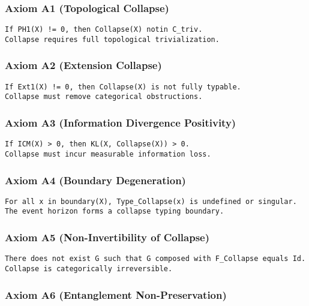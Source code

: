 \documentclass[11pt]{article}
\begin{document}
\subsubsection*{Axiom A1 (Topological Collapse)}

\begin{lstlisting}
If PH1(X) != 0, then Collapse(X) notin C_triv.
Collapse requires full topological trivialization.
\end{lstlisting}

\subsubsection*{Axiom A2 (Extension Collapse)}

\begin{lstlisting}
If Ext1(X) != 0, then Collapse(X) is not fully typable.
Collapse must remove categorical obstructions.
\end{lstlisting}

\subsubsection*{Axiom A3 (Information Divergence Positivity)}

\begin{lstlisting}
If ICM(X) > 0, then KL(X, Collapse(X)) > 0.
Collapse must incur measurable information loss.
\end{lstlisting}

\subsubsection*{Axiom A4 (Boundary Degeneration)}

\begin{lstlisting}
For all x in boundary(X), Type_Collapse(x) is undefined or singular.
The event horizon forms a collapse typing boundary.
\end{lstlisting}

\subsubsection*{Axiom A5 (Non-Invertibility of Collapse)}

\begin{lstlisting}
There does not exist G such that G composed with F_Collapse equals Id.
Collapse is categorically irreversible.
\end{lstlisting}

\subsubsection*{Axiom A6 (Entanglement Non-Preservation)}
\end{document}

